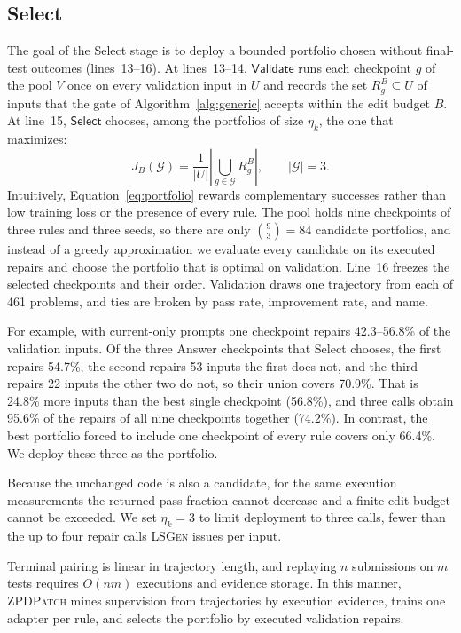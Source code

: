 \documentclass[10pt,conference]{IEEEtran}
\begin{document}
\subsection{Select}
\label{sec:select}
The goal of the Select stage is to deploy a bounded portfolio chosen without final-test outcomes (lines~13--16). At lines~13--14, \(\mathsf{Validate}\) runs each checkpoint \(g\) of the pool \(V\) once on every validation input in \(U\) and records the set \(R_g^B\subseteq U\) of inputs that the gate of Algorithm~\ref{alg:generic} accepts within the edit budget \(B\). At line~15, \(\mathsf{Select}\) chooses, among the portfolios of size \(\eta_k\), the one that maximizes:
\begin{equation}
 J_B(\mathcal G)=\frac{1}{|U|}\left|\bigcup_{g\in\mathcal G} R_g^B\right|,\qquad |\mathcal G|=3.
\label{eq:portfolio}
\end{equation}
Intuitively, Equation~\eqref{eq:portfolio} rewards complementary successes rather than low training loss or the presence of every rule. The pool holds nine checkpoints of three rules and three seeds, so there are only \(\binom{9}{3}=84\) candidate portfolios, and instead of a greedy approximation we evaluate every candidate on its executed repairs and choose the portfolio that is optimal on validation. Line~16 freezes the selected checkpoints and their order. Validation draws one trajectory from each of 461 problems, and ties are broken by pass rate, improvement rate, and name.

For example, with current-only prompts one checkpoint repairs 42.3--56.8\% of the validation inputs. Of the three Answer checkpoints that Select chooses, the first repairs 54.7\%, the second repairs 53 inputs the first does not, and the third repairs 22 inputs the other two do not, so their union covers 70.9\%. That is 24.8\% more inputs than the best single checkpoint (56.8\%), and three calls obtain 95.6\% of the repairs of all nine checkpoints together (74.2\%). In contrast, the best portfolio forced to include one checkpoint of every rule covers only 66.4\%. We deploy these three as the portfolio.

Because the unchanged code is also a candidate, for the same execution measurements the returned pass fraction cannot decrease and a finite edit budget cannot be exceeded. We set \(\eta_k=3\) to limit deployment to three calls, fewer than the up to four repair calls \textsc{LSGen} issues per input.

Terminal pairing is linear in trajectory length, and replaying \(n\) submissions on \(m\) tests requires \(O(nm)\) executions and evidence storage. In this manner, \textsc{ZPDPatch} mines supervision from trajectories by execution evidence, trains one adapter per rule, and selects the portfolio by executed validation repairs.
\end{document}
